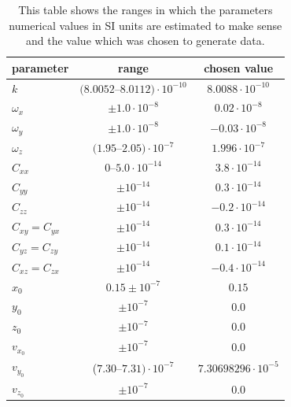 \documentclass[prb,preprint]{revtex4-1}
\begin{document}
\begin{table}[h]
	\centering
	\caption{This table shows the ranges in which the parameters numerical values in SI units are estimated to make sense and the value which was chosen to generate data.}
	\begin{ruledtabular}
		\begin{tabular}{l c c}
			parameter & range & chosen value \\
			\hline	%
			$k$ & $(8.0052$--$8.0112) \cdot 10^{-10}$ & $8.0088 \cdot 10^{-10}$ \\
			$\omega_x$ & $\pm 1.0 \cdot 10^{-8}$ & $0.02 \cdot 10^{-8}$ \\
			$\omega_y$ & $\pm 1.0 \cdot 10^{-8}$ & $-0.03 \cdot 10^{-8}$ \\
			$\omega_z$ & $(1.95$--$2.05) \cdot 10^{-7}$ & $1.996 \cdot 10^{-7}$ \\
			$C_{xx}$ & $0$--$5.0 \cdot 10^{-14}$ & $3.8 \cdot 10^{-14}$ \\
			$C_{yy}$ & $\pm 10^{-14}$ & $0.3 \cdot 10^{-14}$ \\
			$C_{zz}$ & $\pm 10^{-14}$ & $-0.2 \cdot 10^{-14}$ \\
			$C_{xy} = C_{yx}$ & $\pm 10^{-14}$ & $0.3 \cdot 10^{-14}$ \\
			$C_{yz} = C_{zy}$ & $\pm 10^{-14}$ & $0.1 \cdot 10^{-14}$ \\
			$C_{xz} = C_{zx}$ & $\pm 10^{-14}$ & $-0.4 \cdot 10^{-14}$ \\
			$x_0$ & $0.15 \pm 10^{-7}$ & $0.15$ \\
			$y_0$ & $\pm 10^{-7}$ & $0.0$ \\ 
			$z_0$ & $\pm 10^{-7}$ & $0.0$ \\ 
			$v_{x_0}$ & $\pm 10^{-7}$ & $0.0$ \\ 
			$v_{y_0}$ & ($7.30$--$7.31) \cdot 10^{-7}$ & $7.30698296 \cdot 10^{-5}$ \\
			$v_{z_0}$ & $\pm 10^{-7}$ & $0.0$ \\
		\end{tabular}
	\end{ruledtabular}
	\label{tab:parameters}
\end{table}
\end{document}
